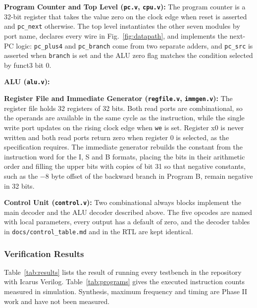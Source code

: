\documentclass[conference]{IEEEtran}
\begin{document}
\noindent\textbf{Program Counter and Top Level (\texttt{pc.v}, \texttt{cpu.v}):}
The program counter is a 32-bit register that takes the value zero on the
clock edge when reset is asserted and \texttt{pc\_next} otherwise. The top
level instantiates the other seven modules by port name, declares every wire
in Fig.~\ref{fig:datapath}, and implements the next-PC logic:
\texttt{pc\_plus4} and \texttt{pc\_branch} come from two separate adders, and
\texttt{pc\_src} is asserted when \texttt{branch} is set and the ALU zero
flag matches the condition selected by funct3 bit 0.

\medskip
\noindent\textbf{ALU (\texttt{alu.v}):}


\medskip
\noindent\textbf{Register File and Immediate Generator (\texttt{regfile.v}, \texttt{immgen.v}):}
The register file holds 32 registers of 32 bits. Both read ports are
combinational, so the operands are available in the same cycle as the
instruction, while the single write port updates on the rising clock edge when
\texttt{we} is set. Register x0 is never written and both read ports return
zero when register 0 is selected, as the specification requires. The
immediate generator rebuilds the constant from the instruction word for the
I, S and B formats, placing the bits in their arithmetic order and filling the
upper bits with copies of bit 31 so that negative constants, such as the
$-8$ byte offset of the backward branch in Program B, remain negative in 32
bits.

\medskip
\noindent\textbf{Control Unit (\texttt{control.v}):}
Two combinational always blocks implement the main decoder and the ALU decoder
described above. The five opcodes are named with local parameters, every
output has a default of zero, and the decoder tables in
\texttt{docs/control\_table.md} and in the RTL are kept identical.

\medskip




\subsubsection{Verification Results}
Table~\ref{tab:results} lists the result of running every testbench in the
repository with Icarus Verilog. Table~\ref{tab:programs} gives the executed
instruction counts measured in simulation. Synthesis, maximum frequency and
timing are Phase II work and have not been measured.
\end{document}
